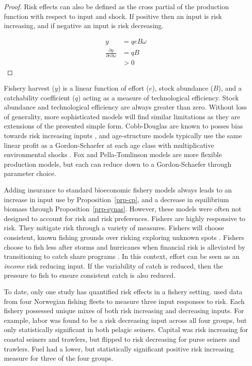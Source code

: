 \documentclass[
  super,
  preprint,
  3p]{elsarticle}
\theoremstyle{plain}
\theoremstyle{plain}
\theoremstyle{remark}
\begin{document}
\begin{proof}

Risk effects can also be defined as the cross partial of the production
function with respect to input and shock. If positive then an input is
risk increasing, and if negative an input is risk decreasing.

\[
\begin{aligned}
y&=qeB\omega \\
\frac{\partial y}{\partial e \partial \omega} &=qB \\
&>0
\end{aligned}
\]

\end{proof}

Fishery harvest (\(y\)) is a linear function of effort (\(e\)), stock
abundance (\(B\)), and a catchability coefficient (\(q\)) acting as a
measure of technological efficiency. Stock abundance and technological
efficiency are always greater than zero. Without loss of generality,
more sophisticated models will find similar limitations as they are
extensions of the presented simple form. Cobb-Douglas are known to
posses bias towards risk increasing inputs \citep{Just1979}, and
age-structure models typically use the same linear profit as a
Gordon-Schaefer at each age class with multiplicative environmental
shocks \citep{Tahvonen2018}. Fox and Pella-Tomlinson models are more
flexible production models, but each can reduce down to a
Gordon-Schaefer through parameter choice.

Adding insurance to standard bioeconomic fishery models always leads to
an increase in input use by Proposition~\ref{prp-cp}, and a decrease in
equilibrium biomass through Proposition~\ref{prp-synas}. However, these
models were often not designed to account for risk and risk preferences.
Fishers are highly responsive to risk. They mitigate risk through a
variety of measures. Fishers will choose consistent, known fishing
grounds over risking exploring unknown spots \citep{Holland2008}.
Fishers choose to fish less after storms and hurricanes when financial
risk is alleviated by transitioning to catch share programs
\citep{Pfeiffer2020, Pfeiffer2022}. In this context, effort can be seen
as an \emph{income} risk reducing input. If the variability of catch is
reduced, then the pressure to fish to ensure consistent catch is also
reduced.

To date, only one study has quantified risk effects in a fishery
setting. \citet{Asche2020} used data from four Norwegian fishing fleets
to measure three input responses to risk. Each fishery possessed unique
mixes of both risk increasing and decreasing inputs. For example, labor
was found to be a risk decreasing input across all four groups, but only
statistically significant in both pelagic seiners. Capital was risk
increasing for coastal seiners and trawlers, but flipped to risk
decreasing for purse seiners and trawlers. Fuel had a lower, but
statistically significant positive risk increasing measure for three of
the four groups.
\end{document}
